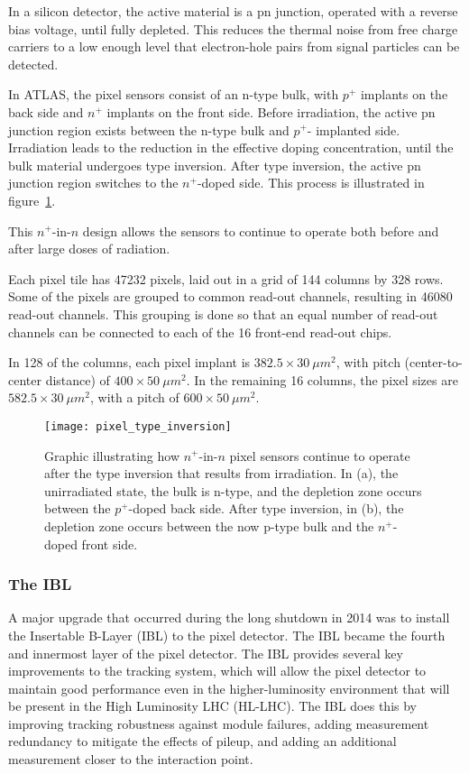 In a silicon detector, the active material is a pn junction, operated with a reverse bias voltage,
until fully depleted.
This reduces the thermal noise from free charge carriers to a low enough level that electron-hole pairs
from signal particles can be detected.\cite{spieler-2005}

In ATLAS, the pixel sensors consist of an n-type bulk, with $p^+$ implants on the back side and $n^+$ implants on the front side.
Before irradiation, the active pn junction region exists between the n-type bulk and $p^+$- implanted side.
Irradiation leads to the reduction in the effective doping concentration,
until the bulk material undergoes type inversion.
After type inversion, the active pn junction region switches to the $n^+$-doped side.\cite{pixels-2008}
This process is illustrated in figure~\ref{fig:pixel_type_inversion}.

This $n^+$-in-$n$ design allows the sensors to continue to operate both before and after large doses of radiation.

Each pixel tile has 47232 pixels, laid out in a grid of 144 columns by 328 rows.
Some of the pixels are grouped to common read-out channels, resulting in 46080 read-out channels.
This grouping is done so that an equal number of read-out channels can be connected to each of
the 16 front-end read-out chips.\cite{pixels-2008}

In 128 of the columns, each pixel implant is $382.5\times30~\mu m^2$, with pitch (center-to-center distance) of  $400\times50~\mu m^2$.
In the remaining 16 columns, the pixel sizes are $582.5\times30~\mu m^2$, with a pitch of  $600\times50~\mu m^2$.\cite{pixels-2008}

\begin{figure}[!ht]\centering
\texttt{[image: pixel\_type\_inversion]}
\caption{Graphic illustrating how $n^+$-in-$n$ pixel sensors continue to operate after the type inversion that results from irradiation.
In (a), the unirradiated state, the bulk is n-type, and the depletion zone occurs between the $p^+$-doped back side.
After type inversion, in (b), the depletion zone occurs between the now p-type bulk and the $n^+$-doped front side.
\cite{pixels-2008}}
\label{fig:pixel_type_inversion}
\end{figure}

\subsubsection{The IBL}
A major upgrade that occurred during the long shutdown in 2014 was to install the Insertable B-Layer (IBL) to the pixel detector.
The IBL became the fourth and innermost layer of the pixel detector.
The IBL provides several key improvements to the tracking system, which will allow the pixel detector to maintain
good performance even in the higher-luminosity environment that will be present in the High Luminosity LHC (HL-LHC).\cite{ibl-tdr}
The IBL does this by improving tracking robustness against module failures,
adding measurement redundancy to mitigate the effects of pileup,
and adding an additional measurement closer to the interaction point.\cite{ibl-tdr}

